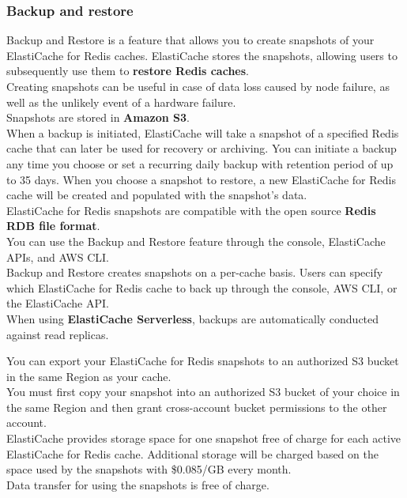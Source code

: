 \documentclass[12pt, letterpaper, twoside]{article}
\begin{document}
\subsubsection{Backup and restore}
Backup and Restore is a feature that allows you to create snapshots of your ElastiCache for Redis caches. ElastiCache stores the 
snapshots, allowing users to subsequently use them to \textbf{restore Redis caches}.\\

Creating snapshots can be useful in case of data loss caused by node failure, as well as the unlikely event of a hardware failure.\\
Snapshots are stored in \textbf{Amazon S3}.\\

When a backup is initiated, ElastiCache will take a snapshot of a specified Redis cache that can later be used for recovery or 
archiving. You can initiate a backup any time you choose or set a recurring daily backup with retention period of up to 35 days. 
When you choose a snapshot to restore, a new ElastiCache for Redis cache will be created and populated with the snapshot’s data.\\
ElastiCache for Redis snapshots are compatible with the open source \textbf{Redis RDB file format}.\\

You can use the Backup and Restore feature through the console, ElastiCache APIs, and AWS CLI.\\

Backup and Restore creates snapshots on a per-cache basis. Users can specify which ElastiCache for Redis cache to back up through 
the console, AWS CLI, or the ElastiCache API.\\
When using \textbf{ElastiCache Serverless}, backups are automatically conducted against read replicas.

You can export your ElastiCache for Redis snapshots to an authorized S3 bucket in the same Region as your cache.\\
You must first copy your snapshot into an authorized S3 bucket of your choice in the same Region and then grant cross-account 
bucket permissions to the other account.\\

ElastiCache provides storage space for one snapshot free of charge for each active ElastiCache for Redis cache. Additional storage 
will be charged based on the space used by the snapshots with \$0.085/GB every month.\\ 
Data transfer for using the snapshots is free of charge.\\
\end{document}
